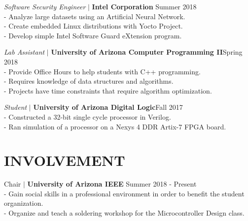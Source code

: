 \documentclass[line, 12pt]{res}
\newcommand\tab[1][0.5cm]{\hspace*{#1}}
\begin{document}
\begin{resume}
				
				
				{\sl Software Security Engineer} $\mid$ \textbf{Intel Corporation} \hfill Summer 2018 \\
                 	\tab - Analyze large datasets using an Artificial Neural Network. \\
                 	\tab - Create embedded Linux distributions with Yocto Project. \\
                 	\tab - Develop simple Intel Software Guard eXtension program.
 		
 
                {\sl Lab Assistant} $\mid$ \textbf{University of Arizona Computer Programming II}\hfill Spring 2018 \\
                 	\tab - Provide Office Hours to help students with C++ programming. \\
                 	\tab - Requires knowledge of data structures and algorithms. \\
                 	\tab - Projects have time constraints that require algorithm optimization.


				{\sl Student} $\mid$ \textbf{University of Arizona Digital Logic}\hfill Fall 2017 \\
						\tab - Constructed a 32-bit single cycle processor in Verilog. \\
						\tab - Ran simulation of a processor on a Nexys 4 DDR Artix-7 FPGA board.
				
				
				

\section{INVOLVEMENT} 
	Chair $\mid$ \textbf{University of Arizona IEEE} \hfill Summer 2018 - Present \\
		\tab - Gain social skills in a professional environment in order to benefit the student organization. \\
		\tab - Organize and teach a soldering workshop for the Microcontroller Design class.
	

\end{resume}
\end{document}
